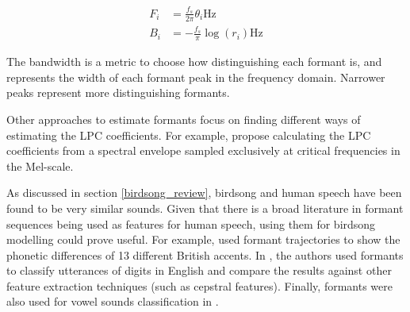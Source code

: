 \documentclass[../main.tex]{subfiles} \label{chapter_soa}
\begin{document}
\begin{align*}
F_i &= \frac{f_s}{2\pi}\theta_i \text{Hz}\\
B_i &= -\frac{f_s}{\pi}\log{(r_i)} \text{Hz}
\end{align*}
\par The bandwidth is a metric to choose how distinguishing each formant is, and represents the width of each formant peak in the frequency domain. Narrower peaks represent more distinguishing formants. 
\par Other approaches to estimate formants focus on finding different ways of estimating the LPC coefficients. For example, \cite{Darch,Araujo1998} propose calculating the LPC coefficients from a spectral envelope sampled exclusively at critical frequencies in the Mel-scale.
\par As discussed in section \ref{birdsong_review}, birdsong and human speech have been found to be very similar sounds. Given that there is a broad literature in formant sequences being used as features for human speech, using them for birdsong modelling could prove useful. For example, \cite{Ferragne2010} used formant trajectories to show the phonetic differences of 13 different British accents. In \cite{Holmes1895}, the authors used formants to classify utterances of digits in English and compare the results against other feature extraction techniques (such as cepstral features). Finally, formants were also used for vowel sounds classification in \cite{markel1976}.
\end{document}
